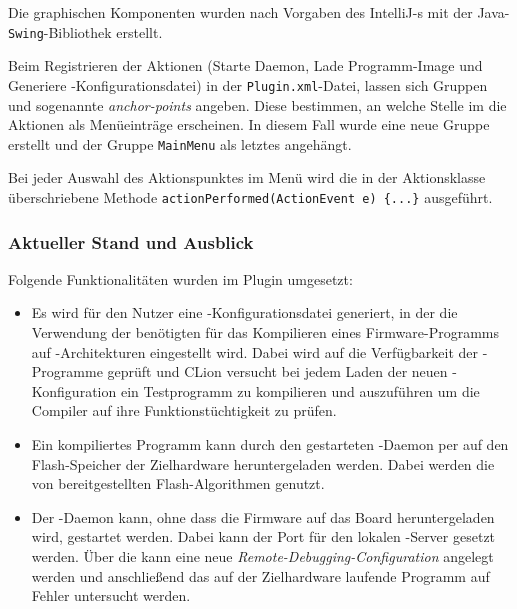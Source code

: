         Die graphischen Komponenten wurden nach Vorgaben des IntelliJ-s mit der Java-\texttt{Swing}-Bibliothek
        erstellt.

        Beim Registrieren der Aktionen (Starte Daemon, Lade Programm-Image und Generiere -Konfigurationsdatei) in der
        \texttt{Plugin.xml}-Datei, lassen sich Gruppen und sogenannte \textit{anchor-points} angeben. Diese bestimmen,
        an welche Stelle im  die Aktionen als Menüeinträge erscheinen. In diesem Fall wurde eine neue Gruppe
        erstellt und der Gruppe \texttt{MainMenu} als letztes angehängt.

        Bei jeder Auswahl des Aktionspunktes im Menü wird die in der Aktionsklasse überschriebene Methode
        \texttt{actionPerformed(ActionEvent e) \{...\}} ausgeführt.

        \subsubsection{Aktueller Stand und Ausblick}
        Folgende Funktionalitäten wurden im Plugin umgesetzt:
        \begin{itemize}
            \item Es wird für den Nutzer eine -Konfigurationsdatei generiert, in der die Verwendung der benötigten
             für das Kompilieren eines Firmware-Programms auf -Architekturen eingestellt wird.
            Dabei wird auf die Verfügbarkeit der -Programme geprüft und CLion versucht bei jedem Laden der
            neuen -Konfiguration ein Testprogramm zu kompilieren und auszuführen um die Compiler auf ihre
            Funktionstüchtigkeit zu prüfen.
            \item Ein kompiliertes Programm kann durch den gestarteten -Daemon per  auf den Flash-Speicher der
            Zielhardware heruntergeladen werden. Dabei werden die von  bereitgestellten Flash-Algorithmen
            genutzt.
            \item Der -Daemon kann, ohne dass die Firmware auf das Board heruntergeladen wird, gestartet werden.
            Dabei kann der Port für den lokalen -Server gesetzt werden. Über die  kann eine neue
            \textit{Remote-Debugging-Configuration} angelegt werden und anschließend das auf der Zielhardware laufende Programm
            auf Fehler untersucht werden.
        \end{itemize}

